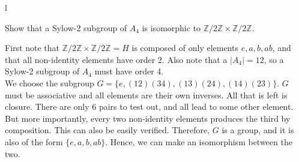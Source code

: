 l\documentclass{scrartcl}
\begin{document}
\begin{problem}[7]
    Show that a Sylow-2 subgroup of $A_4$ is isomorphic to $\mathbb{Z}/2\mathbb{Z} \times \mathbb{Z}/2\mathbb{Z}$.
\end{problem}

\begin{soln}
    First note that $\mathbb{Z}/2\mathbb{Z} \times \mathbb{Z}/2\mathbb{Z}=H$ is composed of only elements $e, a, b, ab$, and that all non-identity elements have order 2. Also note that a $|A_4| = 12$, so a Sylow-2 subgroup of $A_4$ must have order 4. \\
    We choose the subgroup $G = \{ e, (12)(34), (13)(24), (14)(23) \}$. $G$ must be associative and all elements are their own inverses. All that is left is closure. There are only $6$ pairs to test out, and all lead to some other element. But more importantly, every two non-identity elements produces the third by composition. This can also be easily verified. Therefore, $G$ is a group, and it is also of the form $\{ e, a, b, ab \}$. Hence, we can make an isomorphism between the two.  
\end{soln}
\end{document}

